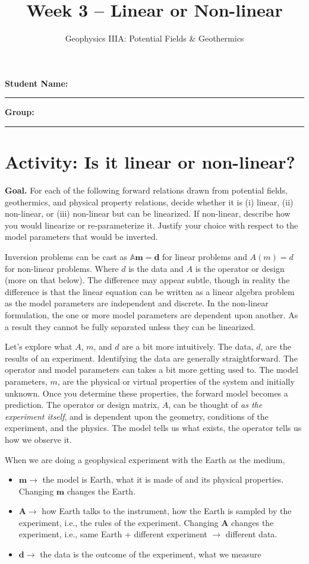 \documentclass[11pt,a4paper]{article}
\title{Week 3 -- Linear or Non-linear}
\author{Geophysics IIIA: Potential Fields \& Geothermics}
\date{}
\begin{document}
\maketitle

\noindent\textbf{Student Name:} \rule{0.45\linewidth}{0.4pt} \textbf{Group:} \rule{0.30\linewidth}{0.4pt}

\vspace{1em}
\section*{Activity: Is it linear or non-linear?}
\textbf{Goal.} For each of the following forward relations drawn from potential fields, geothermics, and physical property relations, decide whether it is (i) linear, (ii) non-linear, or (iii) non-linear but can be linearized. If non-linear, describe how you would linearize or re-parameterize it. Justify your choice with respect to the model parameters that would be inverted.

Inversion problems can be cast as \(\mathbb{A}\mathbf{m} = \mathbf{d}\) for linear problems and \(A(m) = d\) for non-linear problems.  Where \(d\) is the data and \(A\) is the operator or design (more on that below).  The difference may appear subtle, though in reality the difference is that the linear equation can be written as a linear algebra problem as the model parameters are independent and discrete.  In the non-linear formulation, the one or more model parameters are dependent upon another.  As a result they cannot be fully separated unless they can be linearized.

Let's explore what \(A\), \(m\), and \(d\) are a bit more intuitively.
The data, \(d\), are the results of an experiment.  Identifying the data are generally straightforward.  The operator and model parameters can takes a bit more getting used to.  The model parameters, \(m\), are the physical or virtual properties of the system and initially unknown.  Once you determine these properties, the forward model becomes a prediction.  The operator or design matrix, \(A\), can be thought of \emph{as the experiment itself}, and is dependent upon the geometry, conditions of the experiment, and the physics.  The model tells us what exists, the operator tells us how we observe it.

When we are doing a geophysical experiment with the Earth as the medium,
\begin{itemize}
  \item \(\mathbf{m} \to \) the model is Earth, what it is made of and its physical properties. Changing \(\mathbf{m}\) changes the Earth.
  \item \(\mathbf{A} \to \) how Earth talks to the instrument, how the Earth is sampled by the experiment, i.e., the rules of the experiment. Changing \(\mathbf{A}\) changes the experiment, i.e., same Earth + different experiment \(\to\) different data.
  \item \(\mathbf{d} \to \) the data is the outcome of the experiment, what we measure
\end{itemize}
\end{document}
